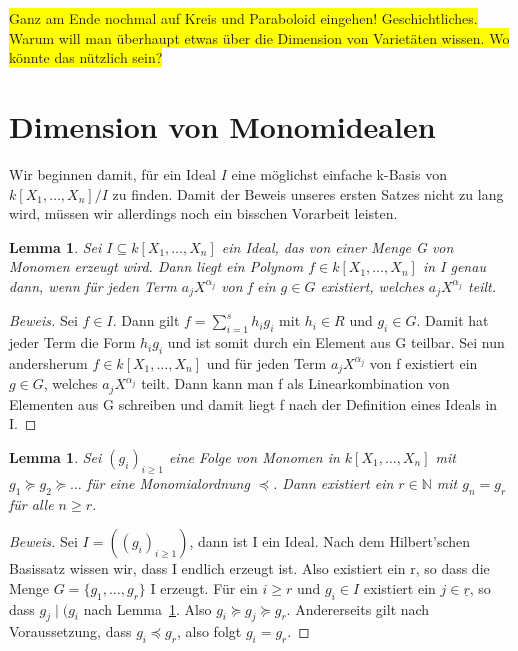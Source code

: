 \documentclass{article}
\newtheorem{lemma}[satz]{Lemma}
\newcommand*{\R}{k[X_{1},\ldots,X_{n}]}
\begin{document}
	\colorbox{yellow}{
	Ganz am Ende nochmal auf Kreis und Paraboloid eingehen!
	Geschichtliches. Warum will man überhaupt etwas über die Dimension von Varietäten wissen.
	Wo könnte das nützlich sein?}

\section{Dimension von Monomidealen}
	
	Wir beginnen damit, für ein Ideal \(I\) eine möglichst einfache k-Basis von \(\R/I\) zu finden.
	Damit der Beweis unseres ersten Satzes nicht zu lang wird, müssen wir allerdings noch ein
	bisschen Vorarbeit leisten.

	\begin{lemma} \label{1.2.3}
	Sei \(I \subseteq \R\) ein Ideal, das von einer Menge G von Monomen erzeugt wird. Dann liegt
	ein Polynom \(f \in \R\) in I genau dann, wenn für jeden Term \(a_{j}X^{\alpha_{j}}\) von f ein
	\(g \in G\) existiert, welches \(a_{j}X^{\alpha_{j}}\) teilt.
	\end{lemma}

	\begin{proof}[Beweis]
	Sei \(f \in I\). Dann gilt \(f = \sum_{i=1}^{s} h_{i}g_{i}\) mit \(h_{i} \in R\) und \(g_{i}
	\in G\). Damit hat jeder Term die Form \(h_{i}g_{i}\) und ist somit durch ein Element aus G
	teilbar.
	Sei nun andersherum \(f \in \R\) und für jeden Term \(a_{j}X^{\alpha_{j}}\) von f existiert ein
	\(g \in G\), welches \(a_{j}X^{\alpha_{j}}\) teilt. Dann kann man f als Linearkombination von 
	Elementen aus G schreiben und damit liegt f nach der Definition eines Ideals in I.
	\end{proof}


	\begin{lemma} \label{1.2.4}
	Sei \((g_{i})_{i \geq 1}\) eine Folge von Monomen in \(\R\) mit \(g_{1} \succeq g_{2} \succeq
	\ldots\) für eine Monomialordnung \(\preceq\). Dann existiert ein \(r \in \mathbb{N}\) mit 
	\(g_{n} = g_{r}\) für alle \(n \geq r\). 
	\end{lemma}

	\begin{proof}[Beweis]
	Sei \(I = ((g_{i})_{i \geq 1})\), dann ist I ein Ideal. Nach dem Hilbert'schen Basissatz
	wissen wir, dass I endlich erzeugt ist. Also existiert ein r, so dass die Menge \(G = \{g_{1},
	\ldots, g_{r}\}\) I erzeugt. Für ein \(i \geq r\) und \(g_{i} \in I\) existiert ein
	\(j \in \underline{r}\), so dass \(g_{j}\; | \;(g_{i}\) nach Lemma~\ref{1.2.3}. Also \(g_{i}
	\succeq g_{j} \succeq g_{r}\). Andererseits gilt nach Voraussetzung, dass \(g_{i} \preceq g_{r}
	\), also folgt \(g_{i} = g_{r}\).
	\end{proof}
\end{document}
